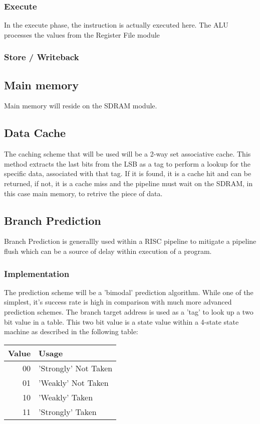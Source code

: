 \documentclass[11pt]{article}
\begin{document}
\subsubsection{Execute}
\label{sec-3-1-3}
In the execute phase, the instruction is actually executed here. The ALU processes the values from the Register File module 


\subsubsection{Store / Writeback}
\label{sec-3-1-4}


\subsection{Main memory}
\label{sec-3-2}
Main memory will reside on the SDRAM module. 

\subsection{Data Cache}
\label{sec-3-3}
The caching scheme that will be used will be a 2-way set associative cache. This method extracts the last bits from the LSB as a tag to perform a lookup for the specific data, associated with that tag. If it is found, it is a cache hit and can be returned, if not, it is a cache miss and the pipeline must wait on the SDRAM, in this case main memory, to retrive the piece of data.


\subsection{Branch Prediction}
\label{sec-3-4}
Branch Prediction is generallly used within a RISC pipeline to mitigate a pipeline flush which can be a source of delay within execution of a program. 

\subsubsection{Implementation}
\label{sec-3-4-1}
The prediction scheme will be a 'bimodal' prediction algorithm. \cite{bate2005efficient}While one of the simplest, it's success rate is high in comparison with much more advanced prediction schemes. The branch target address is used as a 'tag' to look up a two bit value in a table. This two bit value is a state value within a 4-state state machine as described in the following table:

\begin{center}
\begin{tabular}{rl}
Value & Usage\\
\hline
00 & 'Strongly' Not Taken\\
01 & 'Weakly' Not Taken\\
10 & 'Weakly' Taken\\
11 & 'Strongly' Taken\\
\end{tabular}
\end{center}
\end{document}
